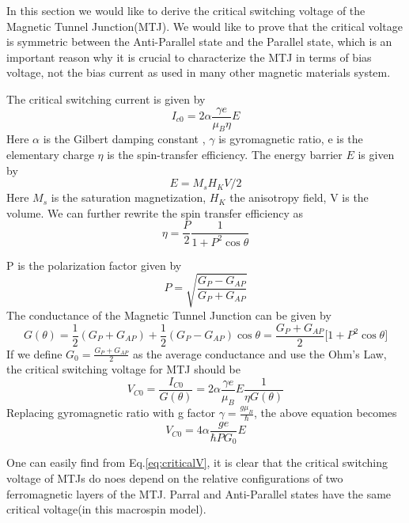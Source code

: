 In this section we would like to derive the critical switching voltage of the Magnetic Tunnel Junction(MTJ). We would like to prove that the critical voltage is symmetric between the Anti-Parallel state and the Parallel state, which is an important reason why it is crucial to characterize the MTJ in terms of bias voltage, not the bias current as used in many other magnetic materials system.

The critical switching current is given by\cite{SlonSwitching}
\begin{equation}
    I_{c0} = 2 \alpha \frac{\gamma e}{\mu_B \eta}E
\end{equation}
Here $\alpha$ is the Gilbert damping constant , $\gamma$ is gyromagnetic ratio, e is the elementary charge  $\eta$ is the spin-transfer efficiency. The energy barrier $E$ is given by
\begin{equation}
    E = M_s H_K V / 2
\end{equation}
Here $M_s$ is the saturation magnetization, $H_K$ the anisotropy field, V is the volume. We can further rewrite the spin transfer efficiency as
\begin{equation}
    \eta = \frac{P}{2}\frac{1}{1+P^2 \cos{\theta}}
\end{equation}

P is the polarization factor given by
\begin{equation}
    P = \sqrt{\frac{G_P - G_{AP}}{ G_P + G_{AP}} }       
\end{equation}
The conductance of the Magnetic Tunnel Junction can be given by\cite{MTJConductance}
\begin{equation}
    G(\theta) = \frac{1}{2} (G_P + G_{AP}) + \frac{1}{2} (G_P - G_{AP}) \cos{\theta}
    = \frac{G_P + G_{AP}}{2}\big[ 1+P^2\cos{\theta} \big]
\end{equation}
If we define $G_0 = \frac{G_P + G_{AP}}{2}$ as the average conductance and use the Ohm's Law, the critical switching voltage for MTJ should be
\begin{equation}
    V_{C0} = \frac{I_{C0}}{G(\theta)} = 2\alpha\frac{\gamma e}{\mu_B}E\frac{1}{\eta G(\theta)}
\end{equation}
Replacing gyromagnetic ratio with g factor $\gamma = \frac{g \mu_B}{\hbar}$, the above equation becomes
\begin{equation}
    \label{eq:criticalV}
    V_{C0} = 4\alpha\frac{ge}{\hbar P G_0}E
\end{equation}

One can easily find from Eq.\ref{eq:criticalV}, it is clear that the critical switching voltage of MTJs do noes depend on the relative configurations of two ferromagnetic layers of the MTJ. Parral and Anti-Parallel states have the same critical voltage(in this macrospin model).  








